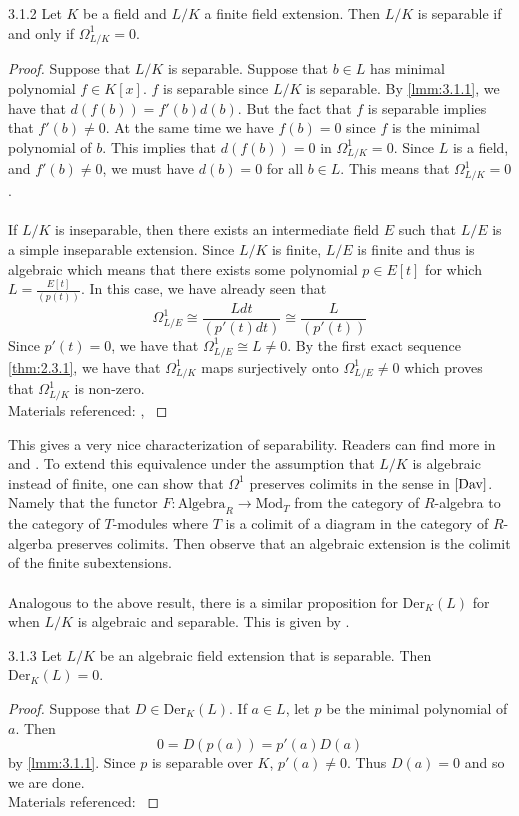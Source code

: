\documentclass[a4paper]{article}
\begin{document}
\begin{prp}{}{3.1.2} Let $K$ be a field and $L/K$ a finite field extension. Then $L/K$ is separable if and only if $\Omega_{L/K}^1=0$. 
\begin{proof}
Suppose that $L/K$ is separable. Suppose that $b\in L$ has minimal polynomial $f\in K[x]$. $f$ is separable since $L/K$ is separable. By \ref{lmm:3.1.1}, we have that $d(f(b))=f'(b)d(b)$. But the fact that $f$ is separable implies that $f'(b)\neq 0$. At the same time we have $f(b)=0$ since $f$ is the minimal polynomial of $b$. This implies that $d(f(b))=0$ in $\Omega_{L/K}^1=0$. Since $L$ is a field, and $f'(b)\neq 0$, we must have $d(b)=0$ for all $b\in L$. This means that $\Omega_{L/K}^1=0$. \\~\\

If $L/K$ is inseparable, then there exists an intermediate field $E$ such that $L/E$ is a simple inseparable extension. Since $L/K$ is finite, $L/E$ is finite and thus is algebraic which means that there exists some polynomial $p\in E[t]$ for which $L=\frac{E[t]}{(p(t))}$. In this case, we have already seen that $$\Omega_{L/E}^1\cong\frac{Ldt}{(p'(t)dt)}\cong\frac{L}{(p'(t))}$$ Since $p'(t)=0$, we have that $\Omega_{L/E}^1\cong L\neq 0$. By the first exact sequence \ref{thm:2.3.1}, we have that $\Omega_{L/K}^1$ maps surjectively onto $\Omega_{L/E}^1\neq 0$ which proves that $\Omega_{L/K}^1$ is non-zero. \\
Materials referenced: \cite{Per}, \cite{Liu}
\end{proof}
\end{prp}

This gives a very nice characterization of separability. Readers can find more in \cite{Har} and \cite{Liu}. To extend this equivalence under the assumption that $L/K$ is algebraic instead of finite, one can show that $\Omega^1$ preserves colimits in the sense in $\cite{Dav}$. Namely that the functor $F:\text{Algebra}_R\to\text{Mod}_T$ from the category of $R$-algebra to the category of $T$-modules where $T$ is a colimit of a diagram in the category of $R$-algerba preserves colimits. Then observe that an algebraic extension is the colimit of the finite subextensions. \\~\\

Analogous to the above result, there is a similar proposition for $\text{Der}_K(L)$ for when $L/K$ is algebraic and separable. This is given by \cite{Pat}. 

\begin{prp}{}{3.1.3} Let $L/K$ be an algebraic field extension that is separable. Then $\text{Der}_K(L)=0$. 
\begin{proof}
Suppose that $D\in\text{Der}_K(L)$. If $a\in L$, let $p$ be the minimal polynomial of $a$. Then $$0=D(p(a))=p'(a)D(a)$$ by \ref{lmm:3.1.1}. Since $p$ is separable over $K$, $p'(a)\neq 0$. Thus $D(a)=0$ and so we are done. \\
Materials referenced: \cite{Pat}
\end{proof}
\end{prp}
\end{document}
